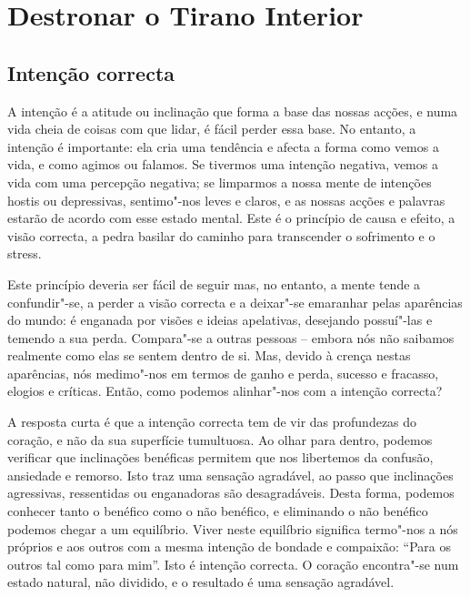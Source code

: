 \chapter{Destronar o Tirano Interior}

\section{Intenção correcta}

A intenção é a atitude ou inclinação que forma a base das nossas acções,
e numa vida cheia de coisas com que lidar, é fácil perder essa base. No
entanto, a intenção é importante: ela cria uma tendência e afecta a
forma como vemos a vida, e como agimos ou falamos. Se tivermos uma
intenção negativa, vemos a vida com uma percepção negativa; se limparmos
a nossa mente de intenções hostis ou depressivas, sentimo"-nos leves e
claros, e as nossas acções e palavras estarão de acordo com esse estado
mental. Este é o princípio de causa e efeito, a visão correcta, a pedra
basilar do caminho para transcender o sofrimento e o stress.

Este princípio deveria ser fácil de seguir mas, no entanto, a mente
tende a confundir"-se, a perder a visão correcta e a deixar"-se emaranhar
pelas aparências do mundo: é enganada por visões e ideias apelativas,
desejando possuí"-las e temendo a sua perda. Compara"-se a outras pessoas
-- embora nós não saibamos realmente como elas se sentem dentro de si.
Mas, devido à crença nestas aparências, nós medimo"-nos em termos de
ganho e perda, sucesso e fracasso, elogios e críticas. Então, como
podemos alinhar"-nos com a intenção correcta?

\sectionBreak

A resposta curta é que a intenção correcta tem de vir das profundezas do
coração, e não da sua superfície tumultuosa. Ao olhar para dentro,
podemos verificar que inclinações benéficas permitem que nos libertemos
da confusão, ansiedade e remorso. Isto traz uma sensação agradável, ao
passo que inclinações agressivas, ressentidas ou enganadoras são
desagradáveis. Desta forma, podemos conhecer tanto o benéfico como o não
benéfico, e eliminando o não benéfico podemos chegar a um equilíbrio.
Viver neste equilíbrio significa termo"-nos a nós próprios e aos outros
com a mesma intenção de bondade e compaixão: “Para os outros tal como
para mim”. Isto é intenção correcta. O coração encontra"-se num estado
natural, não dividido, e o resultado é uma sensação agradável.

